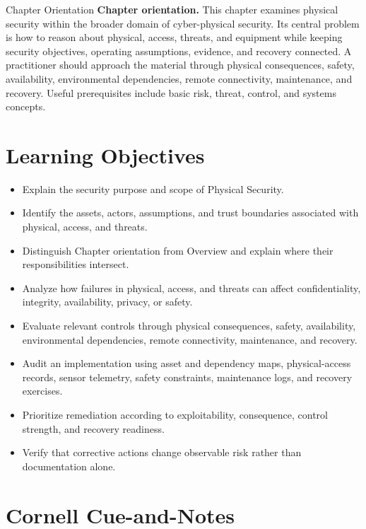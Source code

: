 \documentclass[11pt,letterpaper]{article}
\title{\CornellDocumentTitle}
\author{}
\date{}
\begin{document}
\maketitle
\begin{CornellOverviewBox}{Chapter Orientation}
\textbf{Chapter orientation.} This chapter examines physical security within the broader domain of cyber-physical security. Its central problem is how to reason about physical, access, threats, and equipment while keeping security objectives, operating assumptions, evidence, and recovery connected. A practitioner should approach the material through physical consequences, safety, availability, environmental dependencies, remote connectivity, maintenance, and recovery. Useful prerequisites include basic risk, threat, control, and systems concepts.
\end{CornellOverviewBox}
\section*{Learning Objectives}
\begin{itemize}
\item Explain the security purpose and scope of Physical Security.
\item Identify the assets, actors, assumptions, and trust boundaries associated with physical, access, and threats.
\item Distinguish Chapter orientation from Overview and explain where their responsibilities intersect.
\item Analyze how failures in physical, access, and threats can affect confidentiality, integrity, availability, privacy, or safety.
\item Evaluate relevant controls through physical consequences, safety, availability, environmental dependencies, remote connectivity, maintenance, and recovery.
\item Audit an implementation using asset and dependency maps, physical-access records, sensor telemetry, safety constraints, maintenance logs, and recovery exercises.
\item Prioritize remediation according to exploitability, consequence, control strength, and recovery readiness.
\item Verify that corrective actions change observable risk rather than documentation alone.
\end{itemize}
\section*{Cornell Cue-and-Notes}
\end{document}
